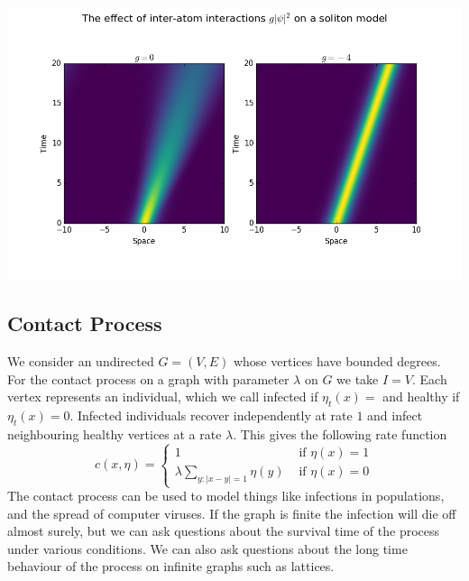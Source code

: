 \documentclass[14pt,a2paper,landscape]{article}
\begin{document}
\begin{multicols*}{3}
{\begin{center}
\includegraphics[scale=0.5]{milestonepic.png}
\end{center}

\subsection*{Contact Process}
We consider an undirected $G=(V,E)$ whose vertices have bounded degrees. For the contact process on 
a graph with parameter $\lambda$ on $G$ we take $I=V$. Each vertex represents an individual, which we call 
infected if $\eta_{t}(x)=$ and healthy if $\eta_{t}(x)=0$. Infected individuals recover independently at rate $1$
and infect neighbouring healthy vertices at a rate $\lambda$. This gives the following rate function
\begin{equation*}
c(x, \eta)=
\begin{cases}
1 & \mbox{ if } \eta(x)=1\\
\lambda \sum_{y: |x-y|=1}\eta(y) & \mbox{ if } \eta(x)=0
\end{cases}
\end{equation*}
The contact process can be used to model things like infections in populations, and the spread of computer
viruses. If the graph is finite the infection will die off almost surely, but we can ask questions about the 
survival time of the process under various conditions. We can also ask questions about the long time 
behaviour of the process on infinite graphs such as lattices.

}
\end{multicols*}
\end{document}

